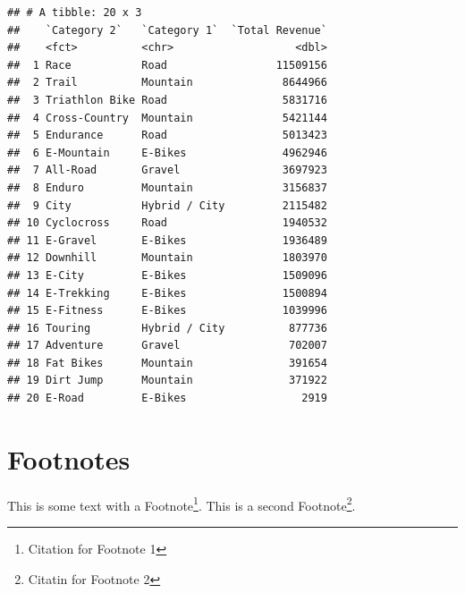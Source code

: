 \documentclass[
]{article}
\begin{document}
\begin{verbatim}
## # A tibble: 20 x 3
##    `Category 2`   `Category 1`  `Total Revenue`
##    <fct>          <chr>                   <dbl>
##  1 Race           Road                 11509156
##  2 Trail          Mountain              8644966
##  3 Triathlon Bike Road                  5831716
##  4 Cross-Country  Mountain              5421144
##  5 Endurance      Road                  5013423
##  6 E-Mountain     E-Bikes               4962946
##  7 All-Road       Gravel                3697923
##  8 Enduro         Mountain              3156837
##  9 City           Hybrid / City         2115482
## 10 Cyclocross     Road                  1940532
## 11 E-Gravel       E-Bikes               1936489
## 12 Downhill       Mountain              1803970
## 13 E-City         E-Bikes               1509096
## 14 E-Trekking     E-Bikes               1500894
## 15 E-Fitness      E-Bikes               1039996
## 16 Touring        Hybrid / City          877736
## 17 Adventure      Gravel                 702007
## 18 Fat Bikes      Mountain               391654
## 19 Dirt Jump      Mountain               371922
## 20 E-Road         E-Bikes                  2919
\end{verbatim}

\hypertarget{footnotes}{%
\section{Footnotes}\label{footnotes}}

This is some text with a Footnote\footnote{Citation for Footnote 1}.
This is a second Footnote\footnote{Citatin for Footnote 2}.
\end{document}
